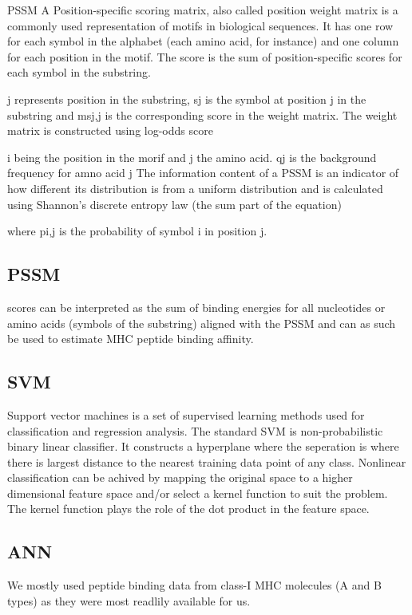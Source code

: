 
PSSM
A Position-specific scoring matrix, also called position weight matrix is a commonly used representation of motifs in biological sequences. It has one row for each symbol in the alphabet (each amino acid, for instance) and one column for each position in the motif. The score is the sum of position-specific scores for each symbol in the substring.



j represents position in the substring, sj is the symbol at position j in the substring and msj,j is the corresponding score in the weight matrix. The weight matrix is constructed using log-odds score



i being the position in the morif and j the amino acid. qj is the background frequency for amno acid j
The information content of a PSSM is an indicator of how different its distribution is from a uniform distribution and is calculated using Shannon's discrete entropy law (the sum part of the equation)



where pi,j is the probability of symbol i in position j.
\subsection*{PSSM} scores can be interpreted as the sum of binding energies for all nucleotides or amino acids (symbols of the substring) aligned with the PSSM and can as such be used to estimate MHC peptide binding affinity.

\subsection*{SVM}
Support vector machines is a set of supervised learning methods used for classification and regression analysis. The standard SVM is non-probabilistic binary linear classifier. It constructs a hyperplane where the seperation is where there is largest distance to the nearest training data point of any class. Nonlinear classification can be achived by  mapping the original space to a higher dimensional feature space and/or select a kernel function to suit the problem. The kernel function plays the role of the dot product in the feature space.

\subsection*{ANN}
We mostly used peptide binding data from class-I MHC molecules (A and B types) as they were most readlily available for us.
